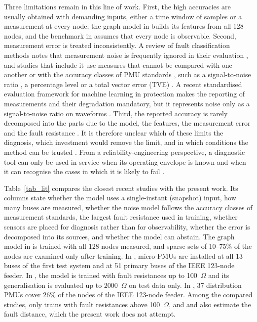 \documentclass[11pt]{article}
\newenvironment{nw}{}{}
\begin{document}
\begin{nw}
Three limitations remain in this line of work. First, the high accuracies are usually obtained with demanding inputs, either a time window of samples or a measurement at every node; the graph model in \cite{chanda2025heterogeneous} builds its features from all 128 nodes, and the benchmark in \cite{chen2026large} assumes that every node is observable. Second, measurement error is treated inconsistently. A review of fault classification methods notes that measurement noise is frequently ignored in their evaluation \cite{stefanidou2022}, and studies that include it use measures that cannot be compared with one another or with the accuracy classes of PMU standards \cite{ieeec37118}, such as a signal-to-noise ratio \cite{zhang2025data}, a percentage level \cite{ngo2025deep} or a total vector error (TVE) \cite{sun2026fault}. A recent standardised evaluation framework for machine learning in protection makes the reporting of measurements and their degradation mandatory, but it represents noise only as a signal-to-noise ratio on waveforms \cite{oelhaf2026standardized}. Third, the reported accuracy is rarely decomposed into the parts due to the model, the features, the measurement error and the fault resistance \cite{oelhaf2025,sun2026fault}. It is therefore unclear which of these limits the diagnosis, which investment would remove the limit, and in which conditions the method can be trusted \cite{oelhaf2026standardized,oelhaf2027architectures}. From a reliability-engineering perspective, a diagnostic tool can only be used in service when its operating envelope is known and when it can recognise the cases in which it is likely to fail \cite{oelhaf2026standardized,oelhaf2025}.

Table~\ref{tab_lit} compares the closest recent studies with the present work. Its columns state whether the model uses a single-instant (snapshot) input, how many buses are measured, whether the noise model follows the accuracy classes of measurement standards, the largest fault resistance used in training, whether sensors are placed for diagnosis rather than for observability, whether the error is decomposed into its sources, and whether the model can abstain. The graph model in \cite{chanda2025heterogeneous} is trained with all 128 nodes measured, and sparse sets of 10--75\% of the nodes are examined only after training. In \cite{ngo2025deep}, micro-PMUs are installed at all 13 buses of the first test system and at 51 primary buses of the IEEE 123-node feeder. In \cite{sun2026fault}, the model is trained with fault resistances up to 100~$\Omega$ and its generalisation is evaluated up to 2000~$\Omega$ on test data only. In \cite{anguswamy2025holistic}, 37 distribution PMUs cover 26\% of the nodes of the IEEE 123-node feeder. Among the compared studies, only \cite{chanda2025heterogeneous} trains with fault resistances above 100~$\Omega$, and \cite{kaliuzhnyi2027statistical} and \cite{anguswamy2025holistic} also estimate the fault distance, which the present work does not attempt.
\end{nw}
\end{document}
